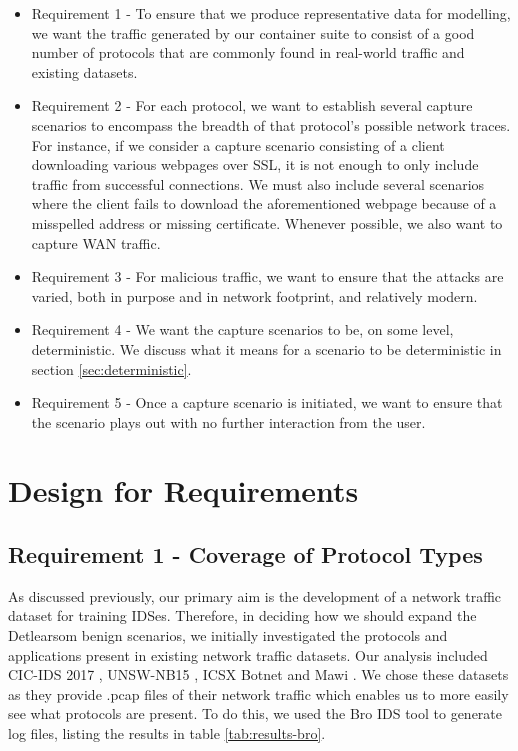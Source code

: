 \documentclass[msc,deptreport, cs]{infthesis} %
\begin{document}
\begin{itemize}

  \item Requirement 1 - To ensure that we produce representative data for modelling, we want the traffic generated by our container suite to consist of a good number of protocols that are commonly found in real-world traffic and existing datasets.
  
  \item Requirement 2 - For each protocol, we want to establish several capture scenarios  to encompass the breadth of that protocol's possible network traces. For instance, if we consider a capture scenario consisting of a client downloading various webpages over SSL, it is not enough to only include traffic from successful connections. We must also include several scenarios where the client fails to download the aforementioned webpage because of a misspelled address or missing certificate. Whenever possible, we also want to capture WAN traffic.
  
  \item Requirement 3 - For malicious traffic, we want to ensure that the attacks are varied, both in purpose and in network footprint, and relatively modern.
 
  \item Requirement 4 - We want the capture scenarios to be, on some level, deterministic. We discuss what it means for a scenario to be deterministic in section \ref{sec:deterministic}. 

  \item Requirement 5 - Once a capture scenario is initiated, we want to ensure that the scenario plays out with no further interaction from the user.
  
  
\end{itemize}

\section{Design for Requirements}

\subsection{Requirement 1 - Coverage of Protocol Types}
\label{sec:bro_logs}
As discussed previously, our primary aim is the development of a network traffic dataset for training IDSes. Therefore, in deciding how we should expand the Detlearsom benign scenarios, we initially investigated the protocols and applications present in existing network traffic datasets. Our analysis included CIC-IDS 2017 \cite{sharafaldin2018toward}, UNSW-NB15 \cite{moustafa2015unsw}, ICSX Botnet \cite{beigi2014towards} and Mawi \cite{fontugne2010mawilab}. We chose these datasets as they provide .pcap files of their network traffic which enables us to more easily see what protocols are present. To do this, we used the Bro IDS tool to generate log files, listing the results in table \ref{tab:results-bro}.
\end{document}
